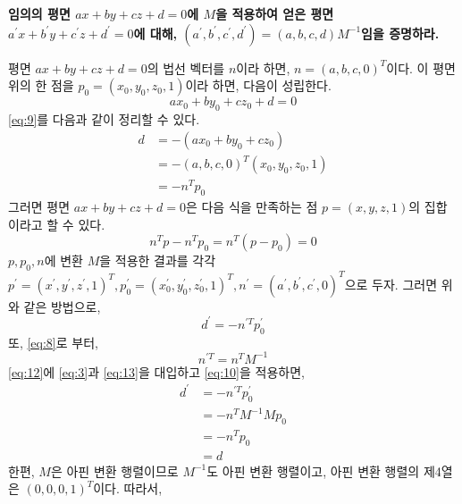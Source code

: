 \documentclass{article}
\begin{document}
\section{}
\textbf{임의의 평면 $ax+by+cz+d=0$에 $M$을 적용하여 얻은 평면 $a^\prime x+b^\prime y+c^\prime z+d^\prime = 0$에 대해, $(a^\prime,b^\prime,c^\prime,d^\prime) = (a,b,c,d)M^{-1}$임을 증명하라.}
\begin{solution}
평면 $ax+by+cz+d=0$의 법선 벡터를 $n$이라 하면, $n = (a, b, c, 0)^T$이다. 이 평면 위의 한 점을 $p_0 = (x_0, y_0, z_0, 1)$이라 하면, 다음이 성립한다.
\begin{equation}
	ax_0 + by_0 + cz_0 + d = 0 \label{eq:9}
\end{equation}
\eqref{eq:9}를 다음과 같이 정리할 수 있다.
\begin{equation} \begin{aligned}
	d &= -(ax_0 + by_0 + cz_0)\\
	&= -(a,b,c,0)^T (x_0,y_0,z_0,1) \\
	&= -n^T p_0 \label{eq:10}
\end{aligned}\end{equation}
그러면 평면 $ax+by+cz+d=0$은 다음 식을 만족하는 점 $p=(x,y,z,1)$의 집합이라고 할 수 있다.
\begin{equation}
	n^T p -n^T p_0 = n^T (p-p_0) = 0 \label{eq:11}
\end{equation}
$p, p_0, n$에 변환 $M$을 적용한 결과를 각각 $p^\prime = (x^\prime, y^\prime, z^\prime, 1)^T, p_0^\prime=(x_0^\prime, y_0^\prime, z_0^\prime, 1)^T, n^\prime=(a^\prime, b^\prime, c^\prime, 0)^T$으로 두자. 그러면 위와 같은 방법으로,
\begin{equation}
	d^\prime = -n^{\prime T} p_0^\prime \label{eq:12}
\end{equation}
또, \eqref{eq:8}로 부터,
\begin{equation}
	n^{\prime T} = n^T M^{-1} \label{eq:13}
\end{equation}
\eqref{eq:12}에 \eqref{eq:3}과 \eqref{eq:13}을 대입하고 \eqref{eq:10}을 적용하면,
\begin{equation} \begin{aligned}
	d^\prime &= -n^{\prime T} p_0^\prime \\
	&= -n^T M^{-1} Mp_0 \\
	&= -n^T p_0 \\
	&= d
\end{aligned}\end{equation}
한편, $M$은 아핀 변환 행렬이므로 $M^{-1}$도 아핀 변환 행렬이고, 아핀 변환 행렬의 제4열은 $(0,0,0,1)^T$이다. 따라서,

\end{solution}
\end{document}
